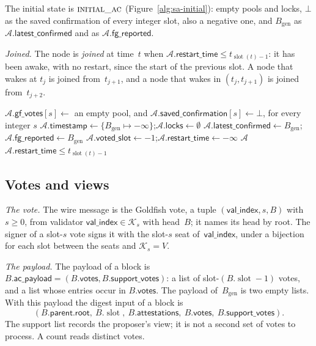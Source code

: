 \documentclass{article}
\newcommand{\genesis}{B_{\mathrm{gen}}}
\newcommand{\slot}{\operatorname{slot}}
\newcommand{\parent}{\mathsf{parent}}
\newcommand{\valindex}{\mathsf{val\_index}}
\newcommand{\rootf}{\mathsf{root}}
\newcommand{\committee}{\mathcal K}
\newcommand{\acp}{\mathsf{ac\_payload}}
\newcommand{\AC}{\mathcal A}
\newcommand{\gfPool}{\mathsf{gf\_votes}}
\newcommand{\latestConfirmed}{\mathsf{latest\_confirmed}}
\newcommand{\timestamp}{\mathsf{timestamp}}
\newcommand{\savedConfirmation}{\mathsf{saved\_confirmation}}
\newcommand{\locks}{\mathsf{locks}}
\newcommand{\restartTime}{\mathsf{restart\_time}}
\newcommand{\fgReported}{\mathsf{fg\_reported}}
\newcommand{\votedSlot}{\mathsf{voted\_slot}}
\begin{document}
The initial state is $\Call{initial\_ac}{}$ (Figure~\ref{alg:sa-initial}):
empty pools and locks, $\bot$ as the saved confirmation of every integer
slot, also a negative one, and
$\genesis$ as $\AC.\latestConfirmed$ and as $\AC.\fgReported$.

\emph{Joined.}  The node is \emph{joined} at time~$t$ when
$\AC.\restartTime\leq t_{\slot(t)-1}$: it has been awake, with no restart,
since the start of the previous slot.  A node that wakes at $t_j$ is joined
from~$t_{j+1}$, and a node that wakes in $(t_j,t_{j+1})$ is joined
from~$t_{j+2}$.

\label{alg:sa-initial}
\nopagebreak
{\footnotesize
\begin{algorithmic}[1]
  \State $\AC.\gfPool[s]\gets$ an empty pool, and $\AC.\savedConfirmation[s]\gets\bot$, for every integer $s$
  \State $\AC.\timestamp\gets\{\genesis\mapsto-\infty\}$;\quad $\AC.\locks\gets\emptyset$
  \State $\AC.\latestConfirmed\gets\genesis$;\quad $\AC.\fgReported\gets\genesis$
  \State $\AC.\votedSlot\gets-1$;\quad $\AC.\restartTime\gets-\infty$
  \State \Return $\AC$
\EndFunction
\vspace{1pt}
\Function{joined}{$\AC,t$}
  \State \Return $\AC.\restartTime\leq t_{\slot(t)-1}$
\EndFunction
\end{algorithmic}
}

\subsection{Votes and views}\label{sec:sa-views}

\emph{The vote.}  The wire message is the Goldfish vote, a tuple
$(\valindex,s,B)$ with $s\geq0$, from validator $\valindex\in\committee_s$
with head~$B$; it names its head by root.  The signer of a slot-$s$ vote
signs it with the slot-$s$ seat of~$\valindex$, under a bijection for each
slot between the seats and $\committee_s=V$.

\emph{The payload.}  The payload of a block is
$B.\acp=(B.\mathsf{votes},B.\mathsf{support\_votes})$: a list of
slot-$(B.\slot-1)$ votes, and a list whose entries occur in
$B.\mathsf{votes}$.  The payload of~$\genesis$ is two empty lists.  With
this payload the digest input of a block is
\[
 (B.\parent.\rootf,\ B.\slot,\ B.\mathsf{attestations},\
 B.\mathsf{votes},\ B.\mathsf{support\_votes}).
\]
The support list records the proposer's view; it is not a second set of
votes to process.  A count reads distinct votes.
\end{document}

